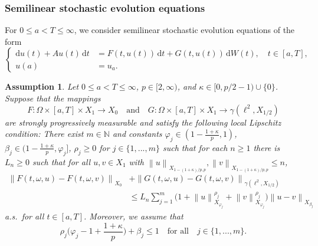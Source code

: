 \documentclass[reqno]{amsart}
\newtheorem{assumption}[Satz]{Assumption}
\newcommand{\N}{\mathbb{N}}
\newcommand{\1}{\mathbf{1}}
\newcommand{\dd}{\ensuremath{\mathrm{d}}}
\newcommand{\nrm}[1]{\left\lVert #1 \right\rVert}
\begin{document}
\subsubsection{Semilinear stochastic evolution equations}
For $0\le a<T\le \infty$, we consider semilinear stochastic evolution equations of the form
\begin{equation}\label{eq:semilinear-stochastic-evolution}
\left\{
\begin{aligned}
    \dd  u(t)+Au(t)\,\dd t
        &= F(t,u(t))\,\dd  t
        +G(t,u(t))\,\dd W(t), \quad t\in [a,T],\\
    u(a)&=u_a.
\end{aligned}\right.
\end{equation}
\begin{assumption}\label{Assumption:semilinear:evolution:equation}
    Let $0\le a<T \le\infty$, $p\in[2,\infty)$, and $\kappa\in [0,p/2-1)\cup\{0\}$. Suppose that the mappings $$F\colon \Omega\times[a,T]\times X_1 \to X_0\quad \text{and}\quad G\colon \Omega\times[a,T]\times X_1\to \gamma(\ell^2,X_{1/2})$$ are strongly progressively measurable and satisfy the following local Lipschitz condition: There exist $m\in \N$ and constants $\varphi_j\in (1-\frac{1+\kappa}{p},1)$, $\beta_j\in (1-\frac{1+\kappa}{p},\varphi_j]$, $\rho_j\ge 0$ for $j\in \{1,...,m\}$ such that  for each $n\ge 1$ there is $L_n\ge 0$ such that for all $u,v\in X_1$ with $\nrm{u}_{X_{1-(1+\kappa)/p,p}},\nrm{v}_{X_{1-(1+\kappa)/p,p}}\le n $, 
    \begin{equation}\label{eq:assumption:semilinear:estimate:local:lipschitz}
        \begin{aligned}
            \nrm{F(t,\omega,u)-F(t,\omega,v)}_{X_0} &+\nrm{G(t,\omega,u)-G(t,\omega,v)}_{\gamma(\ell^2,X_{1/2})}\\
            &\le L_n\sum_{j=1}^m \big(1+\nrm{u}_{X_{\varphi_j}}^{\rho_j}+\nrm{v}_{X_{\varphi_j}}^{\rho_j}\big)\nrm{u-v}_{X_{\beta_j}}
        \end{aligned}
    \end{equation}
    a.s.\ for all $t\in [a,T]$. 
    Moreover, we assume that 
    \begin{equation}\label{eq:subcriticality}
        \rho_j\Big(\varphi_j-1+\frac{1+\kappa}{p}\Big)+\beta_j\le 1 \quad \text{for all}\quad j\in\{1,...,m\}.
    \end{equation}
\end{assumption}
\end{document}
